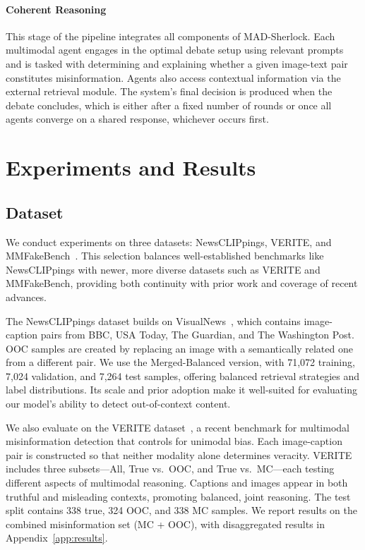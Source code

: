 \documentclass{article}
\theoremstyle{plain}
\theoremstyle{definition}
\theoremstyle{remark}
\newcommand{\frameworkname}{MAD-Sherlock}
\begin{document}
\paragraph{Coherent Reasoning}
This stage of the pipeline integrates all components of \frameworkname{}. Each multimodal agent engages in the optimal debate setup using relevant prompts and is tasked with determining and explaining whether a given image-text pair constitutes misinformation. Agents also access contextual information via the external retrieval module. The system’s final decision is produced when the debate concludes, which is either after a fixed number of rounds or once all agents converge on a shared response, whichever occurs first.

\section{Experiments and Results}
\label{sec:exp}
\subsection{Dataset}
We conduct experiments on three datasets: NewsCLIPpings, VERITE, and MMFakeBench~\citep{luo2021newsclippings, verite, mmfakebench}. This selection balances well-established benchmarks like NewsCLIPpings with newer, more diverse datasets such as VERITE and MMFakeBench, providing both continuity with prior work and coverage of recent advances.

The NewsCLIPpings dataset builds on VisualNews~\citep{liu2020visualnews}, which contains image-caption pairs from BBC, USA Today, The Guardian, and The Washington Post. OOC samples are created by replacing an image with a semantically related one from a different pair. We use the Merged-Balanced version, with 71,072 training, 7,024 validation, and 7,264 test samples, offering balanced retrieval strategies and label distributions. Its scale and prior adoption make it well-suited for evaluating our model’s ability to detect out-of-context content.
%

We also evaluate on the VERITE dataset~\citep{verite}, a recent benchmark for multimodal misinformation detection that controls for unimodal bias. Each image-caption pair is constructed so that neither modality alone determines veracity. VERITE includes three subsets—All, True vs.~OOC, and True vs.~MC—each testing different aspects of multimodal reasoning. Captions and images appear in both truthful and misleading contexts, promoting balanced, joint reasoning. The test split contains 338 true, 324 OOC, and 338 MC samples. We report results on the combined misinformation set (MC + OOC), with disaggregated results in Appendix~\ref{app:results}.
\end{document}
